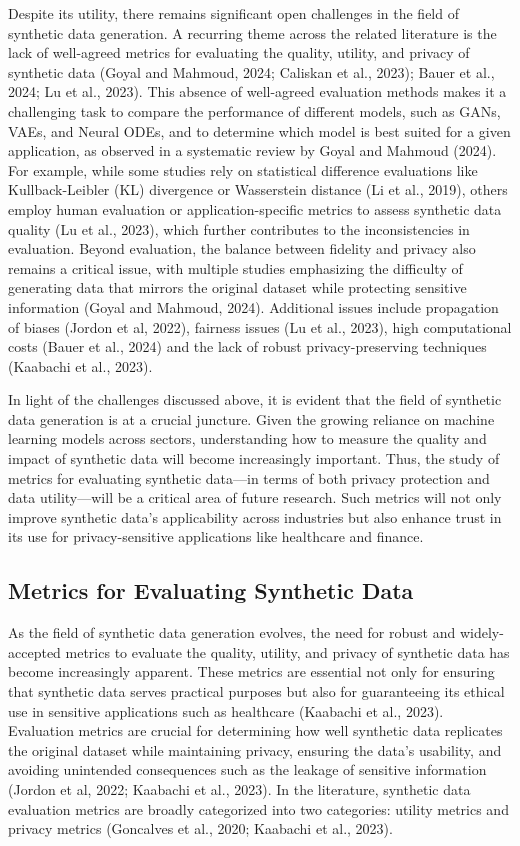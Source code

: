 \documentclass{article}
\begin{document}
Despite its utility, there remains significant open challenges in the field of synthetic data generation. A recurring theme across the related literature is the lack of well-agreed metrics for evaluating the quality, utility, and privacy of synthetic data (Goyal and Mahmoud, 2024; Caliskan et al., 2023); Bauer et al., 2024; Lu et al., 2023). This absence of well-agreed evaluation methods makes it a challenging task to compare the performance of different models, such as GANs, VAEs, and Neural ODEs, and to determine which model is best suited for a given application, as observed in a systematic review by Goyal and Mahmoud (2024). For example, while some studies rely on statistical difference evaluations like Kullback-Leibler (KL) divergence or Wasserstein distance (Li et al., 2019), others employ human evaluation or application-specific metrics to assess synthetic data quality (Lu et al., 2023), which further contributes to the inconsistencies in evaluation. Beyond evaluation, the balance between fidelity and privacy also remains a critical issue, with multiple studies emphasizing the difficulty of generating data that mirrors the original dataset while protecting sensitive information (Goyal and Mahmoud, 2024). Additional issues include propagation of biases (Jordon et al, 2022), fairness issues (Lu et al., 2023), high computational costs (Bauer et al., 2024) and the lack of robust privacy-preserving techniques (Kaabachi et al., 2023).

In light of the challenges discussed above, it is evident that the field of synthetic data generation is at a crucial juncture. Given the growing reliance on machine learning models across sectors, understanding how to measure the quality and impact of synthetic data will become increasingly important. Thus, the study of metrics for evaluating synthetic data—in terms of both privacy protection and data utility—will be a critical area of future research. Such metrics will not only improve synthetic data's applicability across industries but also enhance trust in its use for privacy-sensitive applications like healthcare and finance.

\subsection{Metrics for Evaluating Synthetic Data}

As the field of synthetic data generation evolves, the need for robust and widely-accepted metrics to evaluate the quality, utility, and privacy of synthetic data has become increasingly apparent. These metrics are essential not only for ensuring that synthetic data serves practical purposes but also for guaranteeing its ethical use in sensitive applications such as healthcare (Kaabachi et al., 2023). Evaluation metrics are crucial for determining how well synthetic data replicates the original dataset while maintaining privacy, ensuring the data’s usability, and avoiding unintended consequences such as the leakage of sensitive information (Jordon et al, 2022; Kaabachi et al., 2023). In the literature, synthetic data evaluation metrics are broadly categorized into two categories: utility metrics and privacy metrics (Goncalves et al., 2020; Kaabachi et al., 2023). 
\end{document}

